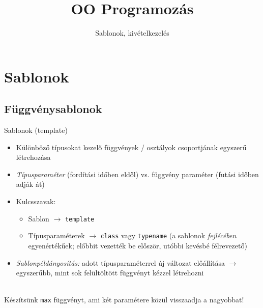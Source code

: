 \documentclass[usenames,dvipsnames,aspectratio=169]{beamer}
\title[OO Programozás - C++]{OO Programozás}
\subtitle{Sablonok, kivételkezelés}
\begin{document}
\begin{frame}[plain]
  \titlepage
  \logoalul
\end{frame}

\section{Sablonok}

\subsection{Függvénysablonok}

\begin{frame}
    Sablonok (template)
    \begin{itemize}
        \item Különböző típusokat kezelő függvények / osztályok csoportjának egyszerű létrehozása
        \item \emph{Típusparaméter} (fordítási időben eldől) vs. függvény paraméter (futási időben adják át)
        \item Kulcsszavak:
        \begin{itemize}
            \item Sablon $\to$ \texttt{template}
            \item Típusparaméterek $\to$ \texttt{class} vagy \texttt{typename} (a sablonok \emph{fejlécében} egyenértékűek; előbbit vezették be először, utóbbi kevésbé félrevezető)
        \end{itemize}
        \item \emph{Sablonpéldányosítás:} adott típusparaméterrel új változat előállítása $\to$ egyszerűbb, mint sok felültöltött függvényt kézzel létrehozni
    \end{itemize}
    \vfill
    \begin{description}[m]
        \item[Feladat:] \hfill \\ Készítsünk \texttt{max} függvényt, ami két paramétere közül visszaadja a nagyobbat!
    \end{description}
\end{frame}

\begin{frame}
    \begin{exampleblock}{}
        
    \end{exampleblock}
\end{frame}
\end{document}
